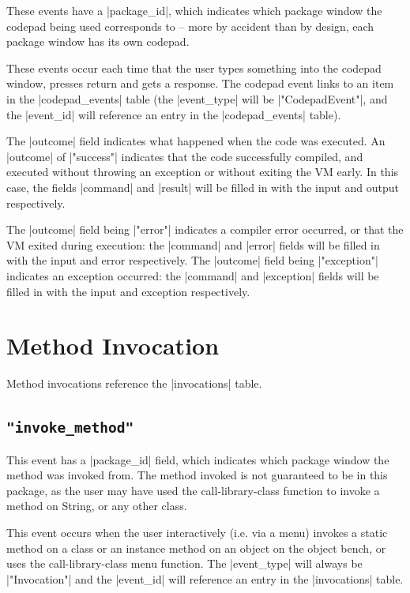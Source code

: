 \documentclass{report}
\begin{document}
These events have a |package_id|, which indicates which package window the
codepad being used corresponds to -- more by accident than by design, each
package window has its own codepad.

These events occur each time that the user types something into the codepad
window, presses return and gets a response.  The codepad event links to an item in the |codepad_events| table (the
|event_type| will be |"CodepadEvent"|, and the |event_id| will reference an
entry in the |codepad_events| table).


The |outcome| field indicates what happened when the code was
executed.  An |outcome| of |"success"| indicates that the code
successfully compiled, and executed without throwing an exception or without
exiting the VM early.  In this case, the fields |command| and |result|
will be filled in with the input and output respectively.


The |outcome| field being |"error"| indicates a compiler error occurred, or that the VM
exited during execution: the |command| and |error| fields will be filled in with the
input and error respectively.  The |outcome| field being |"exception"|
indicates an exception occurred: the |command| and |exception| fields
will be filled in with the input and exception respectively.


\section{Method Invocation}

Method invocations reference the |invocations| table.


\subsection{\lstinline!"invoke_method"!}

This event has a |package_id| field, which indicates which package window the
method was invoked from.  The method invoked is not guaranteed to be in this
package, as the user may have used the call-library-class function to invoke a
method on String, or any other class.

This event occurs when the user interactively (i.e. via a menu) invokes a
static method on a class or an instance method on an object on the object
bench, or uses the call-library-class menu function.  The |event_type| will
always be |"Invocation"| and the |event_id| will reference an entry in the
|invocations| table.  
\end{document}
